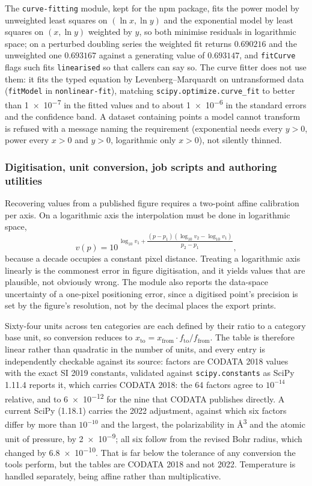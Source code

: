 \documentclass[11pt,a4paper]{article}
\begin{document}
The \texttt{curve-fitting} module, kept for the npm package, fits the power
model by unweighted least squares on $(\ln x, \ln y)$ and the exponential model
by least squares on $(x, \ln y)$ weighted by $y$, so both minimise residuals in
logarithmic space; on a perturbed doubling series the weighted fit returns
$\num{0.690216}$ and the unweighted one $\num{0.693167}$ against a generating
value of $\num{0.693147}$, and \texttt{fitCurve} flags such fits
\texttt{linearised} so that callers can say so. The curve fitter does not use
them: it fits the typed equation by Levenberg--Marquardt on untransformed data
(\texttt{fitModel} in \texttt{nonlinear-fit}), matching
\texttt{scipy.optimize.curve\_fit} to better than \num{1e-7} in the fitted
values and to about \num{1e-6} in the standard errors and the confidence band. A
dataset containing points a model cannot transform is refused with a message
naming the requirement (exponential needs every $y > 0$, power every $x > 0$ and
$y > 0$, logarithmic only $x > 0$), not silently thinned.

\subsubsection{Digitisation, unit conversion, job scripts and authoring utilities}

Recovering values from a published figure requires a two-point affine
calibration per axis. On a logarithmic axis the interpolation must be done in
logarithmic space,
\begin{equation}
  v(p) = 10^{\,\log_{10} v_1
              + \dfrac{(p - p_1)\left(\log_{10} v_2 - \log_{10} v_1\right)}
                      {p_2 - p_1}},
\end{equation}
because a decade occupies a constant pixel distance. Treating a logarithmic axis
linearly is the commonest error in figure digitisation, and it yields values
that are plausible, not obviously wrong. The module also reports the data-space uncertainty of a one-pixel positioning
error, since a digitised point's precision is set by the figure's resolution,
not by the decimal places the export prints.

Sixty-four units across ten categories are each defined by their ratio to a
category base unit, so conversion reduces to $x_{\mathrm{to}} =
x_{\mathrm{from}} \cdot f_{\mathrm{to}} / f_{\mathrm{from}}$. The table is
therefore linear rather than quadratic in the number of units, and every entry
is independently checkable against its source: factors are CODATA 2018
values~\cite{tiesinga2021} with the exact SI 2019 constants, validated against
\texttt{scipy.constants} as SciPy 1.11.4 reports it, which carries CODATA 2018:
the 64 factors agree to $10^{-14}$ relative, and to \num{6e-12} for the nine that
CODATA publishes directly. A current SciPy (1.18.1) carries the 2022
adjustment, against which six factors differ by more than $10^{-10}$ and the
largest, the polarizability in \si{\angstrom\cubed} and the atomic unit of
pressure, by \num{2e-9}; all six follow from the revised Bohr radius, which
changed by \num{6.8e-10}. That is far below the tolerance of any conversion the
tools perform, but the tables are CODATA 2018 and not 2022. Temperature is handled separately, being affine rather than
multiplicative.
\end{document}
